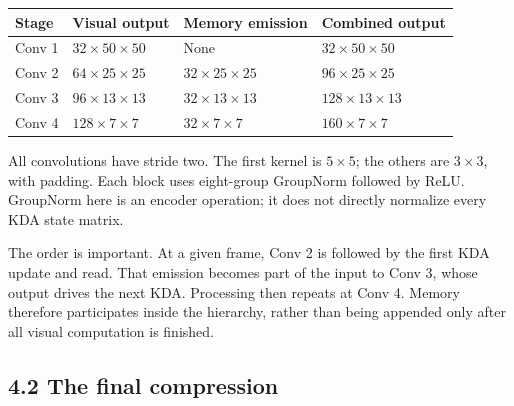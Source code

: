 \documentclass[
  11pt,
]{article}
\newcounter{none} %
\let\oldsubsection\subsection
\renewcommand{\subsection}{\Needspace{6\baselineskip}\oldsubsection}
\begin{document}
{\def\LTcaptype{none} %
\begin{longtable}[]{@{}
  >{\raggedright\arraybackslash}p{}
  >{\raggedright\arraybackslash}p{}
  >{\raggedright\arraybackslash}p{}
  >{\raggedright\arraybackslash}p{}@{}}
\toprule\noalign{}
\begin{minipage}[b]{\linewidth}\raggedright
Stage
\end{minipage} & \begin{minipage}[b]{\linewidth}\raggedright
Visual output
\end{minipage} & \begin{minipage}[b]{\linewidth}\raggedright
Memory emission
\end{minipage} & \begin{minipage}[b]{\linewidth}\raggedright
Combined output
\end{minipage} \\
\midrule\noalign{}
\endhead
\bottomrule\noalign{}
\endlastfoot
Conv 1 & \(32\times50\times50\) & None & \(32\times50\times50\) \\
Conv 2 & \(64\times25\times25\) & \(32\times25\times25\) &
\(96\times25\times25\) \\
Conv 3 & \(96\times13\times13\) & \(32\times13\times13\) &
\(128\times13\times13\) \\
Conv 4 & \(128\times7\times7\) & \(32\times7\times7\) &
\(160\times7\times7\) \\
\end{longtable}
}

All convolutions have stride two. The first kernel is \(5\times5\); the
others are \(3\times3\), with padding. Each block uses eight-group
GroupNorm followed by ReLU. GroupNorm here is an encoder operation; it
does not directly normalize every KDA state matrix.

The order is important. At a given frame, Conv 2 is followed by the
first KDA update and read. That emission becomes part of the input to
Conv 3, whose output drives the next KDA. Processing then repeats at
Conv 4. Memory therefore participates inside the hierarchy, rather than
being appended only after all visual computation is finished.

\subsection{4.2 The final compression}\label{the-final-compression}
\end{document}
